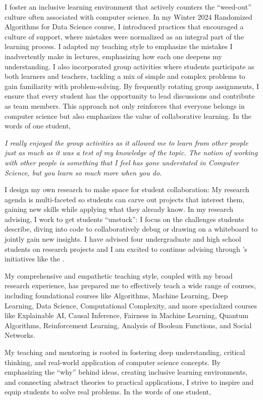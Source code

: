 \documentclass[11pt]{article}
\begin{document}
{I foster an inclusive learning environment that actively counters the “weed-out” culture often associated with computer science. In my Winter 2024 Randomized Algorithms for Data Science course, I introduced practices that encouraged a culture of support, where mistakes were normalized as an integral part of the learning process. I adapted my teaching style to emphasize the mistakes I inadvertently make in lectures, emphasizing how each one deepens my understanding. I also incorporated group activities where students participate as both learners and teachers, tackling a mix of simple and complex problems to gain familiarity with problem-solving. By frequently rotating group assignments, I ensure that every student has the opportunity to lead discussions and contribute as team members. This approach not only reinforces that everyone belongs in computer science but also emphasizes the value of collaborative learning. In the words of one student,

\begin{displayquote}
	\textit{I really enjoyed the group activities as it allowed me to learn from other people just as much as it was a test of my knowledge of the topic. The notion of working with other people is something that I feel has gone understated in Computer Science, but you learn so much more when you do.}
\end{displayquote}

I design my own research to make space for student collaboration: My research agenda is multi-faceted so students can carve out projects that interest them, gaining new skills while applying what they already know. In my research advising, I work to get students “unstuck”: I focus on the challenges students describe, diving into code to collaboratively debug or drawing on a whiteboard to jointly gain new insights. I have advised four undergraduate and high school students on research projects and I am excited to continue advising through \school’s initiatives like the \program.

My comprehensive and empathetic teaching style, coupled with my broad research experience, has prepared me to effectively teach a wide range of courses, including foundational courses like Algorithms, Machine Learning, Deep Learning, Data Science, Computational Complexity, and more specialized courses like Explainable AI, Causal Inference, Fairness in Machine Learning, Quantum Algorithms, Reinforcement Learning, Analysis of Boolean Functions, and Social Networks.

My teaching and mentoring is rooted in fostering deep understanding, critical thinking, and real-world application of computer science concepts. By emphasizing the ``why'' behind ideas, creating inclusive learning environments, and connecting abstract theories to practical applications, I strive to inspire and equip students to solve real problems. In the words of one student,

}
\end{document}
